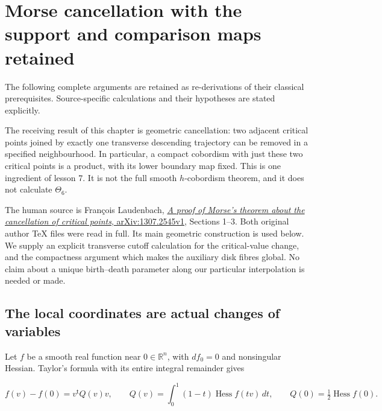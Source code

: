 \section{Morse cancellation with the support and comparison maps retained}\label{courseIII:morse-cancellation-with-controlled-support:section}

The following complete arguments are retained as re-derivations of their classical prerequisites. Source-specific calculations and their hypotheses are stated explicitly.

The receiving result of this chapter is geometric cancellation: two adjacent critical points joined by exactly one transverse descending trajectory can be removed in a specified neighbourhood. In particular, a compact cobordism with just these two critical points is a product, with its lower boundary map fixed. This is one ingredient of lesson 7. It is not the full smooth \(h\)-cobordism theorem, and it does not calculate \(\Theta _6\).

The human source is François Laudenbach, \href{https://arxiv.org/abs/1307.2545v1}{\emph{A proof of Morse's theorem about the cancellation of critical points}, arXiv:1307.2545v1}, Sections 1--3. Both original author TeX files were read in full. Its main geometric construction is used below. We supply an explicit transverse cutoff calculation for the critical-value change, and the compactness argument which makes the auxiliary disk fibres global. No claim about a unique birth--death parameter along our particular interpolation is needed or made.

\subsection{The local coordinates are actual changes of variables}
\label{courseIII:morse-cancellation-with-controlled-support:morse-coordinate-comparison}

\label{courseIII:morse-cancellation-with-controlled-support:section-1}\label{courseIII:morse-cancel:1}

Let \(f\) be a smooth real function near \(0\in\mathbb R^n\), with \(df_0=0\) and nonsingular Hessian. Taylor's formula with its entire integral remainder gives

\begin{equation}
f(v)-f(0)=v^{\mathsf t}Q(v)v,
\qquad
Q(v)=\int_0^1(1-t)\operatorname{Hess}f(tv)\,dt,
\qquad Q(0)=\tfrac12\operatorname{Hess}f(0).
\label{courseIII:morse-cancellation-with-controlled-support:eq:1.1}
\end{equation}

